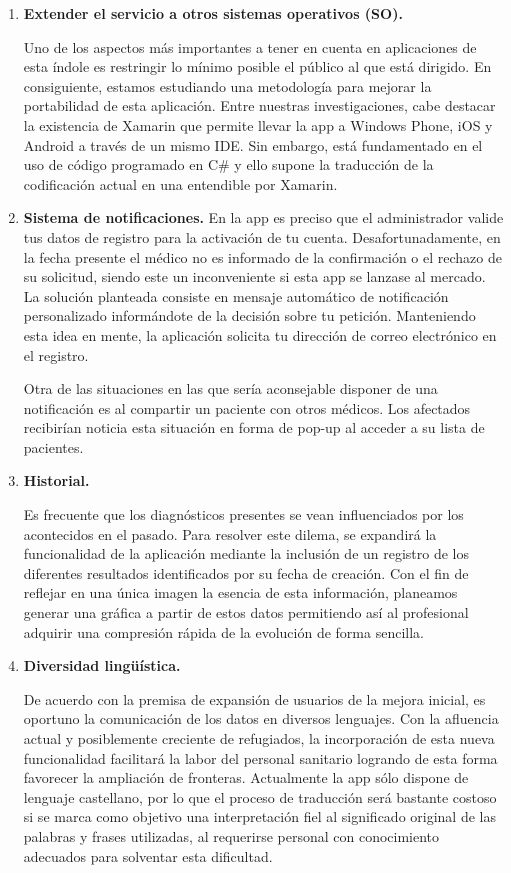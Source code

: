 \documentclass[11pt,spanish,
		listoftables,listoffigures]
		{tfgplantilla}
\begin{document}
\begin{enumerate}
	\item \textbf {Extender el servicio a otros sistemas operativos (SO).}

Uno de los aspectos más importantes a tener en cuenta en aplicaciones de esta índole es restringir lo mínimo posible el público al que está dirigido. En consiguiente, estamos estudiando una metodología para mejorar la portabilidad de esta aplicación. Entre nuestras investigaciones, cabe destacar la existencia de Xamarin que permite llevar la app a Windows Phone, iOS y Android a través de un mismo IDE. Sin embargo, está fundamentado en el uso de código programado en C\# y ello supone la traducción de la codificación actual en una entendible por Xamarin.

	\item \textbf {Sistema de notificaciones.} 
En la app es preciso que el administrador valide tus datos de registro para la activación de tu cuenta. Desafortunadamente, en la fecha presente el médico no es informado de la confirmación o el rechazo de su solicitud, siendo este un inconveniente si esta app se lanzase al mercado. La solución planteada consiste en mensaje automático de notificación personalizado informándote de la decisión sobre tu petición. Manteniendo esta idea en mente, la aplicación solicita tu dirección de correo electrónico en el registro. 

Otra de las situaciones en las que sería aconsejable disponer de una notificación es al compartir un paciente con otros médicos. Los afectados recibirían noticia esta situación en forma de pop-up al acceder a su lista de pacientes.

	\item \textbf {Historial.}

Es frecuente que los diagnósticos presentes se vean influenciados por los acontecidos en el pasado. Para resolver este dilema, se expandirá la funcionalidad de la aplicación mediante la inclusión de un registro de los diferentes resultados identificados por su fecha de creación. Con el fin de reflejar en una única imagen la esencia de esta información, planeamos generar una gráfica a partir de estos datos permitiendo así al profesional adquirir una compresión rápida de la evolución de forma sencilla.

	\item \textbf {Diversidad lingüística.}

De acuerdo con la premisa de expansión de usuarios de la mejora inicial, es oportuno la comunicación de los datos en diversos lenguajes. Con la afluencia actual y posiblemente creciente de refugiados, la incorporación de esta nueva funcionalidad facilitará la labor del personal sanitario logrando de esta forma favorecer la ampliación de fronteras. Actualmente la app sólo dispone de lenguaje castellano, por lo que el proceso de traducción será bastante costoso si se marca como objetivo una interpretación fiel al significado original de las palabras y frases utilizadas, al requerirse personal con conocimiento adecuados para solventar esta dificultad.


\end{enumerate}
\end{document}
